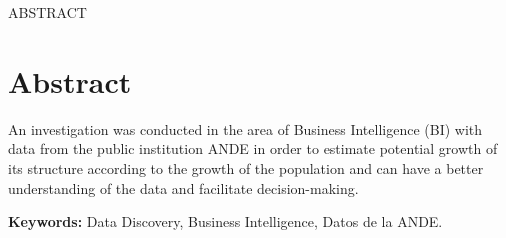 \begin{center}
	ABSTRACT
\end{center}

\vspace*{2\baselineskip}
\chapter*{Abstract}
	An investigation was conducted in the area of Business Intelligence (BI) with data from the public institution ANDE in order to estimate potential growth of its structure according to the growth of the population and can have a better understanding of the data and facilitate decision-making.


\vspace*{1\baselineskip}
\textbf{Keywords:} Data Discovery, Business Intelligence, Datos de la ANDE.
